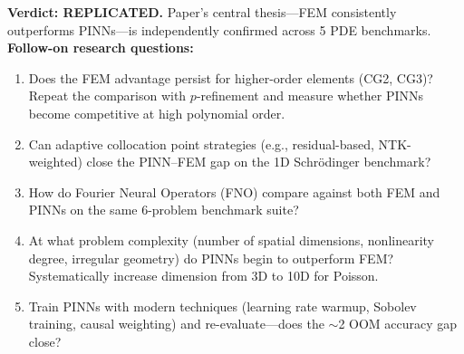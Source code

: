\documentclass[11pt]{article}
\begin{document}
\noindent\textbf{Verdict: REPLICATED.} Paper's central thesis---FEM consistently outperforms PINNs---is independently confirmed across 5 PDE benchmarks.
\noindent\textbf{Follow-on research questions:}
\begin{enumerate}[leftmargin=1.6em,itemsep=0.2em,topsep=0.2em,label=Q\arabic*.]
\item Does the FEM advantage persist for higher-order elements (CG2, CG3)? Repeat the comparison with $p$-refinement and measure whether PINNs become competitive at high polynomial order.
\item Can adaptive collocation point strategies (e.g., residual-based, NTK-weighted) close the PINN--FEM gap on the 1D Schr\"odinger benchmark?
\item How do Fourier Neural Operators (FNO) compare against both FEM and PINNs on the same 6-problem benchmark suite?
\item At what problem complexity (number of spatial dimensions, nonlinearity degree, irregular geometry) do PINNs begin to outperform FEM? Systematically increase dimension from 3D to 10D for Poisson.
\item Train PINNs with modern techniques (learning rate warmup, Sobolev training, causal weighting) and re-evaluate---does the $\sim$2 OOM accuracy gap close?
\end{enumerate}
\end{document}
